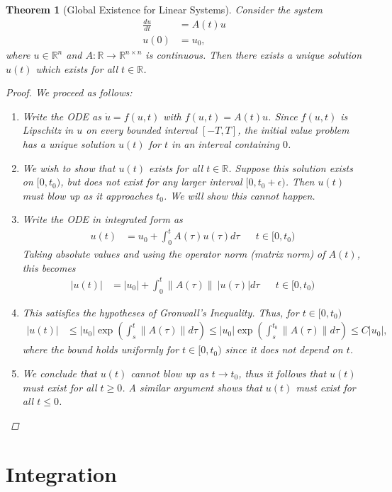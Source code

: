 \documentclass[12pt]{amsart}         %
\newtheorem{theorem}{Theorem}[section]
\theoremstyle{remark}
\newcommand{\R}{\mathbb{R}}
\begin{document}
\begin{theorem}[Global Existence for Linear Systems]
Consider the system
\begin{align*}
\frac{du}{dt} &= A(t) u \\
u(0) &= u_0,
\end{align*}
where $u \in \R^n$ and $A:\R \rightarrow \R^{n \times n}$ is continuous. Then there exists a unique solution $u(t)$ which exists for all $t \in \R$.
\begin{proof}We proceed as follows:
\begin{enumerate}
\item Write the ODE as $\dot{u} = f(u, t)$ with $f(u,t) = A(t) u$. Since $f(u, t)$ is Lipschitz in $u$ on every bounded interval $[-T, T]$, the initial value problem has a unique solution $u(t)$ for $t$ in an interval containing $0$. 
\item We wish to show that $u(t)$ exists for all $t \in \R$. Suppose this solution exists on $[0, t_0)$, but does not exist for any larger interval $[0, t_0 + \epsilon)$. Then $u(t)$ must blow up as it approaches $t_0$. We will show this cannot happen.
\item Write the ODE in integrated form as
\begin{align*}
u(t) &= u_0 + \int_0^t A(\tau)u(\tau)d\tau && t \in [0, t_0)
\end{align*}
Taking absolute values and using the operator norm (matrix norm) of $A(t)$, this becomes
\begin{align*}
|u(t)| &= |u_0| + \int_0^t \|A(\tau)\|\:|u(\tau)|d\tau && t \in [0, t_0)
\end{align*}
\item This satisfies the hypotheses of Gronwall's Inequality. Thus, for $t \in [0, t_0)$
\begin{align*}
|u(t)| &\leq |u_0| \exp \left( \int_s^t \|A(\tau)\| d\tau \right) 
\leq |u_0| \exp \left( \int_s^{t_0} \|A(\tau)\| d\tau \right) 
\leq C |u_0|,
\end{align*}
where the bound holds uniformly for $t \in [0, t_0)$ since it does not depend on $t$.
\item We conclude that $u(t)$ cannot blow up as $t \rightarrow t_0$, thus it follows that $u(t)$ must exist for all $t \geq 0$. A similar argument shows that $u(t)$ must exist for all $t \leq 0$.
\end{enumerate}
\end{proof}
\end{theorem}

\section{Integration}
\end{document}
